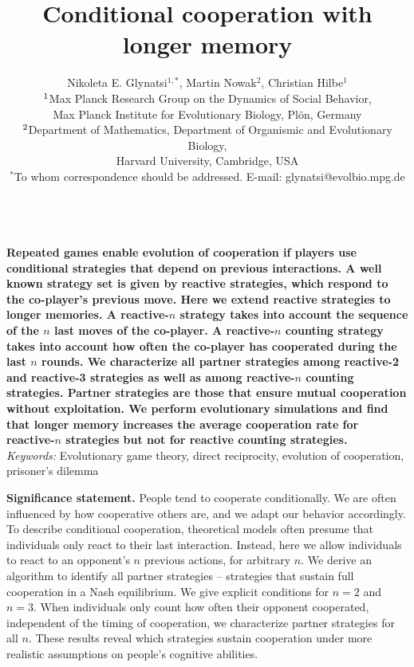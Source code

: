 \documentclass[11pt]{article}
\title{\bfseries \sffamily \Large Conditional cooperation with longer memory}
\author{Nikoleta E. Glynatsi$^{1,*}$, Martin Nowak$^2$, Christian Hilbe$^1$\\[0.3cm]
$^{\rm 1}$Max Planck Research Group on the Dynamics of Social Behavior,\\ Max Planck Institute for Evolutionary Biology, Pl\"{o}n, Germany \\
$^{\rm 2}$Department of Mathematics,
Department of Organismic and Evolutionary Biology,\\ Harvard University, Cambridge, USA\\
$^*$To whom correspondence should be addressed. E-mail: glynatsi@evolbio.mpg.de
}
\date{}
\begin{document}
\maketitle

~\\[0.5cm]
\noindent
{\bf 
Repeated games enable evolution of cooperation if players use conditional
strategies that depend on previous interactions. A well known strategy set is
given by reactive strategies, which respond to the co-player's previous move.
Here we extend reactive strategies to longer memories. A reactive-$n$ strategy
takes into account the sequence of the $n$ last moves of the co-player. A
reactive-$n$ counting strategy takes into account how often the co-player has
cooperated during the last $n$ rounds. We characterize all partner strategies among
reactive-2 and reactive-3 strategies as well as among reactive-$n$ counting
strategies. Partner strategies are those that ensure mutual cooperation without
exploitation. We perform evolutionary simulations and find that longer memory
increases the average cooperation rate for reactive-$n$ strategies but not for
reactive counting strategies.
}\\[1cm]


\noindent
{\it Keywords:} Evolutionary game theory, direct reciprocity, evolution of cooperation, prisoner's dilemma



\clearpage
\newpage



\noindent
{\bf Significance statement.} People tend to cooperate conditionally. 
We are often influenced by how cooperative others are, and we adapt our behavior accordingly. 
To describe conditional cooperation, theoretical models often presume that individuals only react to their last interaction. 
Instead, here we allow individuals to react to an opponent's $n$ previous actions, for arbitrary $n$.
We derive an algorithm to identify all partner strategies -- strategies that sustain full cooperation in a Nash equilibrium.
We give explicit conditions for $n\!=\!2$ and $n\!=\!3$. 
When individuals only count how often their opponent cooperated, independent of the timing of cooperation, we characterize partner strategies for all $n$.
These results reveal which strategies sustain cooperation under more realistic assumptions on people's cognitive abilities. 
\end{document}
